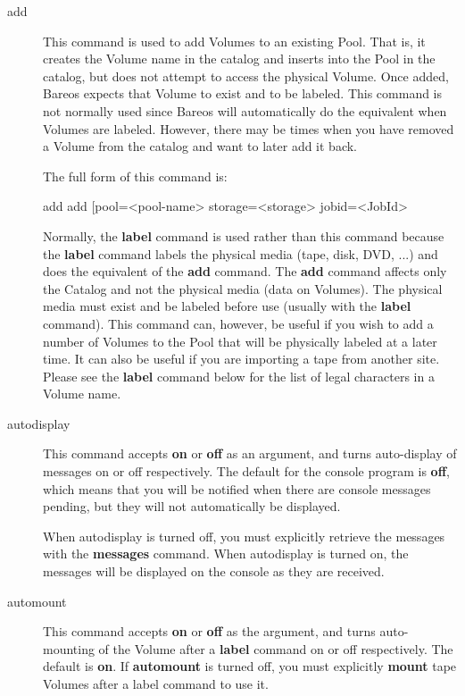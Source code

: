 \begin{description}
\item [add]
   This command is used to add Volumes to an existing Pool.  That is,
   it creates the Volume name in the catalog and inserts into the Pool
   in the catalog, but does not attempt to access the physical Volume.
   Once added, Bareos expects that Volume to exist and to be labeled.
   This command is not normally used since Bareos will
   automatically do the equivalent when Volumes are labeled. However,
   there may be times when you have removed a Volume from the catalog
   and want to later add it back.

   The full form of this command is:

\begin{bconsole}{add}
add [pool=<pool-name> storage=<storage> jobid=<JobId>
\end{bconsole}


   Normally, the {\bf label} command is used rather than this command
   because the {\bf label} command labels the physical media (tape, disk,
   DVD, ...) and does the equivalent of the {\bf add} command.  The {\bf
   add} command affects only the Catalog and not the physical media (data
   on Volumes).  The physical media must exist and be labeled before use
   (usually with the {\bf label} command).  This command can, however, be
   useful if you wish to add a number of Volumes to the Pool that will be
   physically labeled at a later time.  It can also be useful if you are
   importing a tape from another site.  Please see the {\bf label} command
   below for the list of legal characters in a Volume name.

\item [autodisplay]
   This command accepts {\bf on} or {\bf off} as an argument, and turns
   auto-display of messages on or off respectively.  The default for the
   console program is {\bf off}, which means that you will be notified when
   there are console messages pending, but they will not automatically be
   displayed.

   When autodisplay is turned off, you must explicitly retrieve the
   messages with the {\bf messages} command.  When autodisplay is turned
   on, the messages will be displayed on the console as they are received.

\item [automount]
   This command accepts {\bf on} or {\bf off} as the argument, and turns
   auto-mounting of the Volume after a {\bf label} command on or off
   respectively.  The default is {\bf on}.  If {\bf automount} is turned
   off, you must explicitly {\bf mount} tape Volumes after a label command to
   use it.


\end{description}

